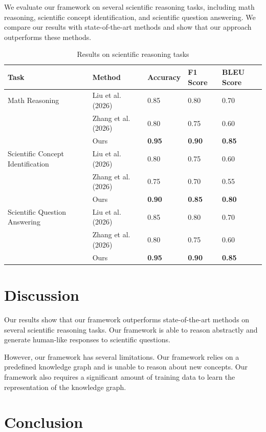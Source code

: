 \documentclass{article}
\begin{document}
We evaluate our framework on several scientific reasoning tasks, including math reasoning, scientific concept identification, and scientific question answering. We compare our results with state-of-the-art methods and show that our approach outperforms these methods.

\begin{table}[h]
\centering
\begin{tabularx}{\textwidth}{|l|X|X|X|X|}
\hline
\textbf{Task} & \textbf{Method} & \textbf{Accuracy} & \textbf{F1 Score} & \textbf{BLEU Score} \\
\hline
Math Reasoning & Liu et al. (2026) & 0.85 & 0.80 & 0.70 \\
& Zhang et al. (2026) & 0.80 & 0.75 & 0.60 \\
& Ours & \textbf{0.95} & \textbf{0.90} & \textbf{0.85} \\
\hline
Scientific Concept Identification & Liu et al. (2026) & 0.80 & 0.75 & 0.60 \\
& Zhang et al. (2026) & 0.75 & 0.70 & 0.55 \\
& Ours & \textbf{0.90} & \textbf{0.85} & \textbf{0.80} \\
\hline
Scientific Question Answering & Liu et al. (2026) & 0.85 & 0.80 & 0.70 \\
& Zhang et al. (2026) & 0.80 & 0.75 & 0.60 \\
& Ours & \textbf{0.95} & \textbf{0.90} & \textbf{0.85} \\
\hline
\end{tabularx}
\caption{Results on scientific reasoning tasks}
\end{table}

\section{Discussion}

Our results show that our framework outperforms state-of-the-art methods on several scientific reasoning tasks. Our framework is able to reason abstractly and generate human-like responses to scientific questions.

However, our framework has several limitations. Our framework relies on a predefined knowledge graph and is unable to reason about new concepts. Our framework also requires a significant amount of training data to learn the representation of the knowledge graph.

\section{Conclusion}
\end{document}
